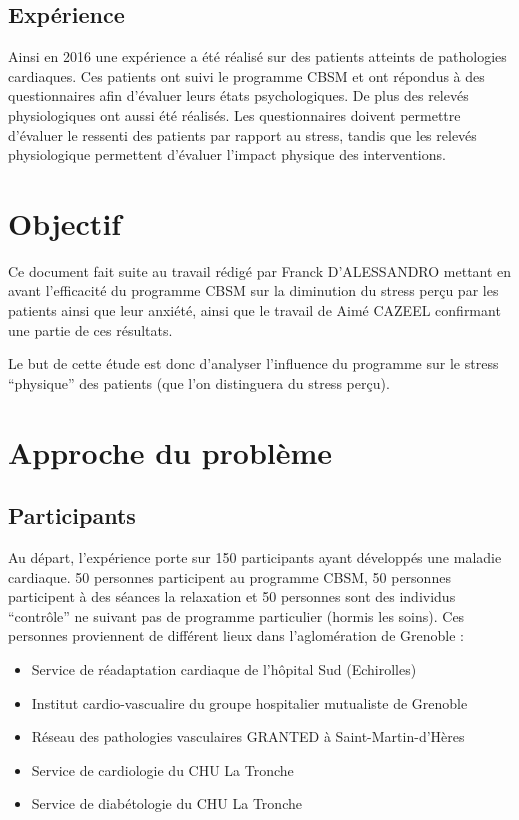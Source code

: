 \documentclass[]{article}
\providecommand{\tightlist}{%
  \setlength{\itemsep}{0pt}\setlength{\parskip}{0pt}}
\begin{document}
\hypertarget{expuxe9rience}{%
\subsection{Expérience}\label{expuxe9rience}}

Ainsi en 2016 une expérience a été réalisé sur des patients atteints de
pathologies cardiaques. Ces patients ont suivi le programme CBSM et ont
répondus à des questionnaires afin d'évaluer leurs états psychologiques.
De plus des relevés physiologiques ont aussi été réalisés. Les
questionnaires doivent permettre d'évaluer le ressenti des patients par
rapport au stress, tandis que les relevés physiologique permettent
d'évaluer l'impact physique des interventions.

\hypertarget{objectif}{%
\section{Objectif}\label{objectif}}

Ce document fait suite au travail rédigé par Franck D'ALESSANDRO mettant
en avant l'efficacité du programme CBSM sur la diminution du stress
perçu par les patients ainsi que leur anxiété, ainsi que le travail de
Aimé CAZEEL confirmant une partie de ces résultats.

Le but de cette étude est donc d'analyser l'influence du programme sur
le stress ``physique'' des patients (que l'on distinguera du stress
perçu).

\newpage

\hypertarget{approche-du-probluxe8me}{%
\section{Approche du problème}\label{approche-du-probluxe8me}}

\hypertarget{participants}{%
\subsection{Participants}\label{participants}}

Au départ, l'expérience porte sur 150 participants ayant développés une
maladie cardiaque. 50 personnes participent au programme CBSM, 50
personnes participent à des séances la relaxation et 50 personnes sont
des individus ``contrôle'' ne suivant pas de programme particulier
(hormis les soins). Ces personnes proviennent de différent lieux dans
l'aglomération de Grenoble :

\begin{itemize}
\tightlist
\item
  Service de réadaptation cardiaque de l'hôpital Sud (Echirolles)
\item
  Institut cardio-vascualire du groupe hospitalier mutualiste de
  Grenoble
\item
  Réseau des pathologies vasculaires GRANTED à Saint-Martin-d'Hères
\item
  Service de cardiologie du CHU La Tronche
\item
  Service de diabétologie du CHU La Tronche
\end{itemize}
\end{document}
